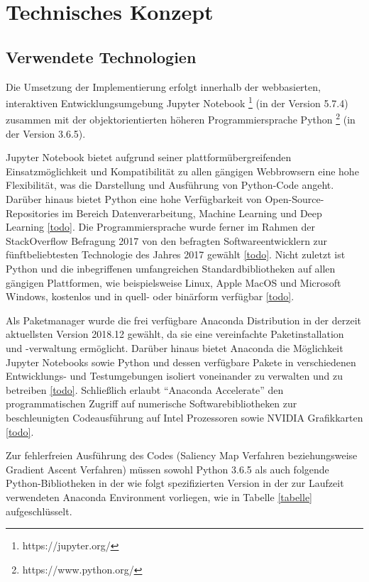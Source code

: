 \chapter{Technisches Konzept}
\section{Verwendete Technologien}
Die Umsetzung der Implementierung erfolgt innerhalb der webbasierten, interaktiven Entwicklungsumgebung Jupyter Notebook \footnote{https://jupyter.org/} (in der Version 5.7.4) zusammen mit der objektorientierten höheren Programmiersprache Python \footnote{https://www.python.org/} (in der Version 3.6.5).


Jupyter Notebook bietet aufgrund seiner plattformübergreifenden Einsatzmöglichkeit und Kompatibilität zu allen gängigen Webbrowsern eine hohe Flexibilität, was die Darstellung und Ausführung von Python-Code angeht. Darüber hinaus bietet Python eine hohe Verfügbarkeit von Open-Source-Repositories im Bereich Datenverarbeitung, Machine Learning und Deep Learning \ref{todo}. Die Programmiersprache wurde ferner im Rahmen der StackOverflow Befragung 2017 von den befragten Softwareentwicklern zur fünftbeliebtesten Technologie des Jahres 2017 gewählt \ref{todo}. Nicht zuletzt ist Python und die inbegriffenen umfangreichen Standardbibliotheken auf allen gängigen Plattformen, wie beispielsweise Linux, Apple MacOS und Microsoft Windows, kostenlos und in quell- oder binärform verfügbar \ref{todo}.


Als Paketmanager wurde die frei verfügbare Anaconda Distribution in der derzeit aktuellsten Version 2018.12 gewählt, da sie eine vereinfachte Paketinstallation und -verwaltung ermöglicht. Darüber hinaus bietet Anaconda die Möglichkeit Jupyter Notebooks sowie Python und dessen verfügbare Pakete in verschiedenen Entwicklungs- und Testumgebungen isoliert voneinander zu verwalten und zu betreiben \ref{todo}. Schließlich erlaubt “Anaconda Accelerate” den programmatischen Zugriff auf numerische Softwarebibliotheken zur beschleunigten Codeausführung auf Intel Prozessoren sowie NVIDIA Grafikkarten \ref{todo}.


Zur fehlerfreien Ausführung des Codes (Saliency Map Verfahren beziehungsweise Gradient Ascent Verfahren) müssen sowohl Python 3.6.5 als auch folgende Python-Bibliotheken in der wie folgt spezifizierten Version in der zur Laufzeit verwendeten Anaconda Environment vorliegen, wie in Tabelle \ref{tabelle} aufgeschlüsselt.



